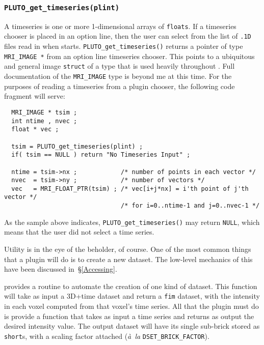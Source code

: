 \subsubsection{{\tt PLUTO\_get\_timeseries(plint)}}
  A timeseries is one or more 1-dimensional arrays of {\tt floats}.  If a timeseries chooser
  is placed in an option line, then the user can select from the list of {\tt *.1D} files
  read in when \afnit starts.  {\tt PLUTO\_get\_timeseries()} returns a pointer
  of type {\tt MRI\_IMAGE~*} from an option line timeseries chooser.
  This points to a ubiquitous and general image {\tt struct}
  of a type that is used heavily throughout \afni.  Full documentation of the
  {\tt MRI\_IMAGE} type is beyond me at this time.  For the purposes of reading a
  timeseries from a plugin chooser, the following code fragment will serve:
\goodbreak
\begin{samepage}\begin{verbatim}
  MRI_IMAGE * tsim ;
  int ntime , nvec ;
  float * vec ;

  tsim = PLUTO_get_timeseries(plint) ;
  if( tsim == NULL ) return "No Timeseries Input" ;

  ntime = tsim->nx ;            /* number of points in each vector */
  nvec  = tsim->ny ;            /* number of vectors */
  vec   = MRI_FLOAT_PTR(tsim) ; /* vec[i+j*nx] = i'th point of j'th vector */
                                /* for i=0..ntime-1 and j=0..nvec-1 */
\end{verbatim}\end{samepage}
  As the sample above indicates, {\tt PLUTO\_get\_timeseries()}
  may return {\tt NULL}, which means that the user did not select a time series.

Utility is in the eye of the beholder, of course.  One of the most common
things that a plugin will do is to create a new dataset.  The low-level
mechanics of this have been discussed in~\S\ref{Accessing}.

\afnit provides a routine to automate the creation of one kind
of dataset.  This function will take as input a 3D+time dataset
and return a {\tt fim} dataset, with the intensity in each voxel
computed from that voxel's time series.  All that the plugin must do
is provide a function that takes as input a time series and returns
as output the desired intensity value.
The output dataset will have its single sub-brick stored as {\tt short}s,
with a scaling factor attached ({\it \`a~la} {\tt DSET\_BRICK\_FACTOR}).

